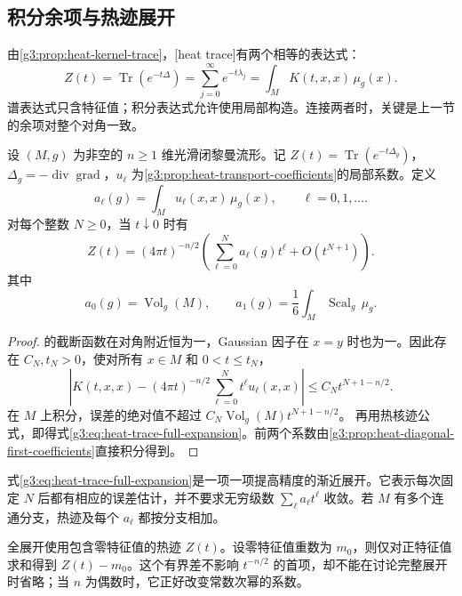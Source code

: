 \subsection{积分余项与热迹展开}
\label{g3:subsec:1603:02}
由\cref{g3:prop:heat-kernel-trace}，[heat trace]有两个相等的表达式：
\[
	Z(t)=\operatorname{Tr}(e^{-t\Delta})
	=\sum_{j=0}^{\infty}e^{-t\lambda_j}
	=\int_M K(t,x,x)\,\mu_g(x).
\]
谱表达式只含特征值；积分表达式允许使用局部构造。连接两者时，关键是上一节的余项对整个对角一致。

\begin{theorem}\label{g3:thm:heat-trace-expansion}
	设 \((M,g)\) 为非空的 \(n\ge1\) 维光滑闭黎曼流形。记 \(Z(t)=\operatorname{Tr}(e^{-t\Delta_g})\)，\(\Delta_g=-\operatorname{div}\operatorname{grad}\)，\(u_\ell\) 为\cref{g3:prop:heat-transport-coefficients}的局部系数。定义
	\[
		a_\ell(g)=\int_Mu_\ell(x,x)\,\mu_g(x),\qquad \ell=0,1,\ldots.
	\]
	对每个整数 \(N\ge0\)，当 \(t\downarrow0\) 时有
	\begin{equation}\label{g3:eq:heat-trace-full-expansion}
		Z(t)=(4\pi t)^{-n/2}
		\left(\sum_{\ell=0}^{N}a_\ell(g)t^\ell+O(t^{N+1})\right).
	\end{equation}
	其中
	\begin{equation}\label{g3:eq:heat-trace-first-two}
		a_0(g)=\operatorname{Vol}_g(M),\qquad
		a_1(g)=\frac16\int_M\operatorname{Scal}_g\,\mu_g.
	\end{equation}
\end{theorem}
\begin{proof}
	的截断函数在对角附近恒为一，Gaussian 因子在 \(x=y\) 时也为一。因此存在 \(C_N,t_N>0\)，使对所有 \(x\in M\) 和 \(0<t\le t_N\)，
	\[
		\left|K(t,x,x)-(4\pi t)^{-n/2}
		\sum_{\ell=0}^{N}t^\ell u_\ell(x,x)\right|
		\le C_Nt^{N+1-n/2}.
	\]
	在 \(M\) 上积分，误差的绝对值不超过
	\(C_N\operatorname{Vol}_g(M)t^{N+1-n/2}\)。
	再用热核迹公式，即得式\eqref{g3:eq:heat-trace-full-expansion}。前两个系数由\cref{g3:prop:heat-diagonal-first-coefficients}直接积分得到。
\end{proof}

式\eqref{g3:eq:heat-trace-full-expansion}是一项一项提高精度的渐近展开。它表示每次固定 \(N\) 后都有相应的误差估计，并不要求无穷级数 \(\sum_\ell a_\ell t^\ell\) 收敛。若 \(M\) 有多个连通分支，热迹及每个 \(a_\ell\) 都按分支相加。

\ProseParagraphBreak

全展开使用包含零特征值的热迹 \(Z(t)\)。设零特征值重数为 \(m_0\)，则仅对正特征值求和得到 \(Z(t)-m_0\)。这个有界差不影响 \(t^{-n/2}\) 的首项，却不能在讨论完整展开时省略；当 \(n\) 为偶数时，它正好改变常数次幂的系数。

